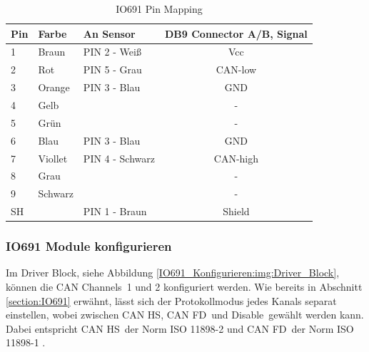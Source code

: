 \pagebreak[1]
\begin{table}[!ht]
	\centering
	\caption{IO691 Pin Mapping}
	\label{speedgoat:IO691}
	\begin{tabular}{lllc}
		\hline
		\textbf{Pin}            & \textbf{Farbe} & \textbf{An Sensor} & \textbf{DB9 Connector A/B, Signal} \\ \hline
		\multicolumn{1}{l|}{1}  & Braun          & PIN 2 -  Weiß      & Vcc                                \\
		\multicolumn{1}{l|}{2}  & Rot            & PIN 5 -  Grau      & CAN-low                            \\
		\multicolumn{1}{l|}{3}  & Orange         & PIN 3 -  Blau      & GND                                \\
		\multicolumn{1}{l|}{4}  & Gelb           &                    & -                                  \\
		\multicolumn{1}{l|}{5}  & Grün           &                    & -                                  \\
		\multicolumn{1}{l|}{6}  & Blau           & PIN 3 -  Blau      & GND                                \\
		\multicolumn{1}{l|}{7}  & Viollet        & PIN 4 -  Schwarz   & CAN-high                           \\
		\multicolumn{1}{l|}{8}  & Grau           &                    & -                                  \\
		\multicolumn{1}{l|}{9}  & Schwarz        &                    & -                                  \\
		\multicolumn{1}{l|}{SH} &                & PIN 1 - Braun      & Shield                             \\ \hline
	\end{tabular}
\end{table}
\pagebreak[1]


\subsubsection{IO691 Module konfigurieren}
\label{Simulink:IO691_Konfigurieren}

Im \frqq Driver Block\flqq, siehe Abbildung \ref{IO691_Konfigurieren:img:Driver_Block}, können die \frqq CAN Channels\flqq\ 1 und 2 konfiguriert werden. Wie bereits in Abschnitt \ref{section:IO691} erwähnt, lässt sich der Protokollmodus jedes Kanals separat einstellen, wobei zwischen \frqq CAN HS\flqq, \frqq CAN FD\flqq\ und \frqq Disable\flqq\ gewählt werden kann. Dabei entspricht \frqq CAN HS\flqq\ der Norm ISO 11898-2 und \frqq CAN FD\flqq\ der Norm ISO 11898-1 \cite[4]{speedgoat:IO691}.

